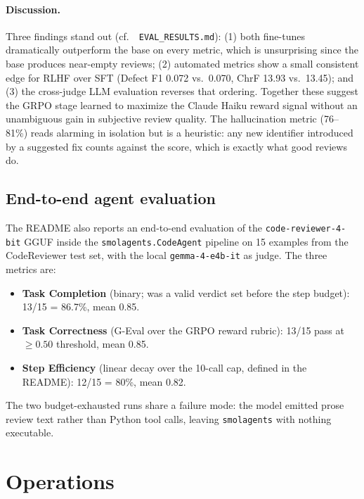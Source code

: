 \documentclass[11pt,a4paper]{article}
\newcommand{\code}[1]{\texttt{\small #1}}
\renewcommand{\path}[1]{\texttt{\small\color{mute} #1}}
\begin{document}
\paragraph{Discussion.} Three findings stand out (cf.\ \path{EVAL\_RESULTS.md}):
(1) both fine-tunes dramatically outperform the base on every metric, which
is unsurprising since the base produces near-empty reviews;
(2) automated metrics show a small consistent edge for RLHF over SFT
(Defect F1 0.072 vs.\ 0.070, ChrF 13.93 vs.\ 13.45); and
(3) the cross-judge LLM evaluation reverses that ordering. Together these
suggest the GRPO stage learned to maximize the Claude Haiku reward signal
without an unambiguous gain in subjective review quality. The hallucination
metric (76--81\%) reads alarming in isolation but is a heuristic: any new
identifier introduced by a suggested fix counts against the score, which is
exactly what good reviews do.

\subsection{End-to-end agent evaluation}

The README also reports an end-to-end evaluation of the
\code{code-reviewer-4-bit} GGUF inside the \code{smolagents.CodeAgent}
pipeline on 15 examples from the CodeReviewer test set, with the local
\code{gemma-4-e4b-it} as judge. The three metrics are:

\begin{itemize}[leftmargin=*,nosep]
  \item \textbf{Task Completion} (binary; was a valid verdict set before
        the step budget): 13/15 = 86.7\%, mean 0.85.
  \item \textbf{Task Correctness} (G-Eval over the GRPO reward rubric):
        13/15 pass at $\ge 0.50$ threshold, mean 0.85.
  \item \textbf{Step Efficiency} (linear decay over the 10-call cap,
        defined in the README): 12/15 = 80\%, mean 0.82.
\end{itemize}

The two budget-exhausted runs share a failure mode: the model emitted
prose review text rather than Python tool calls, leaving \code{smolagents}
with nothing executable.

\section{Operations}
\end{document}

